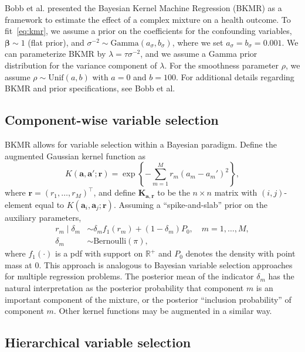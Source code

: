 Bobb et al.\cite{bobb_bkmr_2015} presented the Bayesian Kernel Machine Regression (BKMR) as a framework to estimate the effect of a complex mixture on a health outcome. To fit~\eqref{eq:kmr}, we assume a prior on the coefficients for the confounding variables, $\boldsymbol{\beta} \sim 1$ (flat prior), and $\sigma^{-2} \sim \text{Gamma}(a_\sigma, b_\sigma)$, where we set $a_\sigma = b_\sigma = 0.001$. We can parameterize BKMR by $\lambda = \tau \sigma^{-2}$, and we assume a Gamma prior distribution for the variance component of $\lambda$. For the smoothness parameter $\rho$, we assume $\rho \sim \text{Unif}(a, b)$ with $a = 0$ and $b = 100$. For additional details regarding BKMR and prior specifications, see Bobb et al.\cite{bobb_bkmr_2015,bobb_bkmr_2018}

\subsection*{Component-wise variable selection}

BKMR allows for variable selection within a Bayesian paradigm. Define the augmented Gaussian kernel function as
\begin{equation*}
    K(\mathbf{a}, \mathbf{a}'; \mathbf{r}) = \exp\!\left\{ -\sum_{m=1}^{M} r_m (a_m - a_m')^2 \right\},
\end{equation*}
where $\mathbf{r} = (r_1, \ldots, r_M)^\top$, and define $\mathbf{K}_{\mathbf{a}, \mathbf{r}}$ to be the $n \times n$ matrix with $(i, j)$-element equal to $K(\mathbf{a}_i, \mathbf{a}_j; \mathbf{r})$. Assuming a ``spike-and-slab'' prior on the auxiliary parameters,
\begin{align*}
    r_m \mid \delta_m &\sim \delta_m f_1(r_m) + (1 - \delta_m) P_0, \quad m = 1, \ldots, M, \\
    \delta_m &\sim \text{Bernoulli}(\pi),
\end{align*}
where $f_1(\cdot)$ is a pdf with support on $\mathbb{R}^+$ and $P_0$ denotes the density with point mass at 0. This approach is analogous to Bayesian variable selection approaches for multiple regression problems.\cite{george_mcculloch_1993} The posterior mean of the indicator $\delta_m$ has the natural interpretation as the posterior probability that component $m$ is an important component of the mixture, or the posterior ``inclusion probability'' of component $m$. Other kernel functions may be augmented in a similar way.

\subsection*{Hierarchical variable selection}

